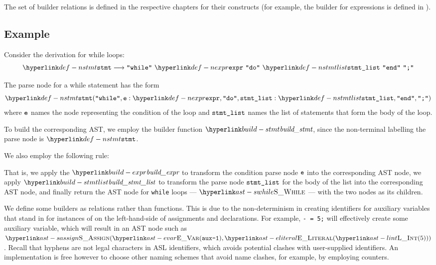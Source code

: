 The set of builder relations is defined in the respective chapters for their constructs
(for example, the builder for expressions is defined in ).

\subsection{Example}
Consider the derivation for while loops:
\[
\Nstmt \derives \Twhile \parsesep \Nexpr \parsesep \Tdo \parsesep \Nstmtlist \parsesep \Tend \parsesep \Tsemicolon
\]

The parse node for a while statement has the form
\[
\Nstmt(\Twhile, \namednode{\ve}{\Nexpr}, \Tdo, \namednode{\vstmtlist}{\Nstmtlist}, \Tend, \Tsemicolon)
\]
where $\ve$ names the node representing the condition of the loop and $\vstmtlist$ names
the list of statements that form the body of the loop.

To build the corresponding AST, we employ the builder function $\buildstmt$, since
the non-terminal labelling the parse node is $\Nstmt$.

We also employ the following rule:
\begin{mathpar}
\end{mathpar}
That is, we apply the $\buildexpr$ to transform the condition parse node $\ve$ into the corresponding AST node,
we apply $\buildstmtlist$ to transform the parse node $\vstmtlist$ for the body of the list into the corresponding AST node,
and finally return the AST node for \texttt{while} loops --- $\SWhile$ --- with the two nodes as its children.

We define some builders as relations rather than functions. This is due to the non-determinism
in creating identifiers for auxiliary variables that stand in for instances of \discardvar{} on the left-hand-side
of assignments and declarations.
For example, \texttt{- = 5;} will effectively create some auxiliary variable, which will result in
an AST node such as $\SAssign(\EVar(\texttt{aux-1}), \ELiteral(\lint(5)))$.
Recall that hyphens are not legal characters in ASL identifiers, which avoids potential clashes with
user-supplied identifiers. An implementation is free however to choose other naming schemes that
avoid name clashes, for example, by employing counters.

